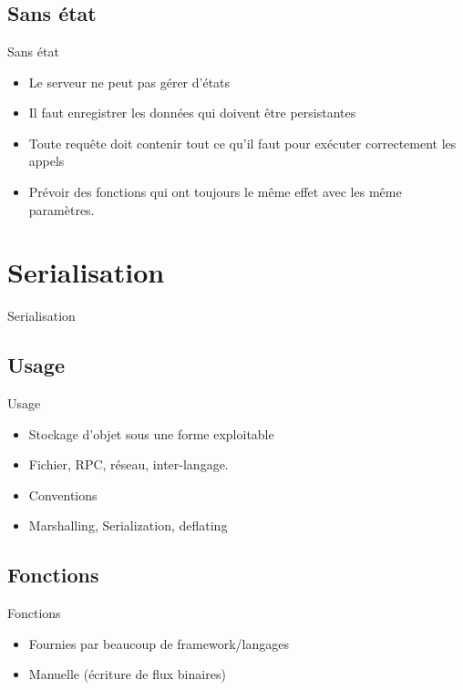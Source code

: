 \section{\sectitle}
\begin{frame}{\sectitle}
    \def\subsectitle{Sans état}
    \subsection{\subsectitle}
    \begin{block}{\subsectitle}
        \begin{itemize}
            \item Le serveur ne peut pas gérer d'états
            \item Il faut enregistrer les données qui doivent être persistantes
            \item Toute requête doit contenir tout ce qu'il faut pour exécuter
                correctement les appels
            \item Prévoir des fonctions qui ont toujours le même effet avec les
                même paramètres.
        \end{itemize}
    \end{block}
\end{frame}

\def\sectitle{Serialisation}
\section{\sectitle}
\begin{frame}{\sectitle}
    \def\subsectitle{Usage}
    \subsection{\subsectitle}
    \begin{block}{\subsectitle}
        \begin{itemize}
            \item Stockage d'objet sous une forme exploitable
            \item Fichier, RPC, réseau, inter-langage. 
            \item Conventions
            \item Marshalling, Serialization, deflating
        \end{itemize}
    \end{block}
    \def\subsectitle{Fonctions}
    \subsection{\subsectitle}
    \begin{block}{\subsectitle}
        \begin{itemize}
            \item Fournies par beaucoup de framework/langages 
            \item Manuelle (écriture de flux binaires)
        \end{itemize}
    \end{block}
\end{frame}

